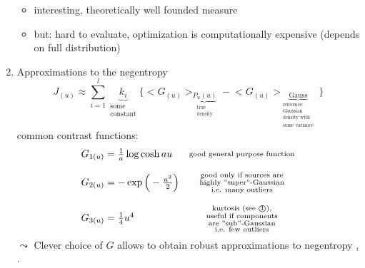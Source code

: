 \begin{enumerate}[(1)]
\begin{itemize}
	\item interesting, theoretically well founded measure
	\item but: hard to evaluate, optimization is computationally expensive (depends on full distribution)
\end{itemize}
\item Approximations to the negentropy
\begin{equation}
	J_{(u)} \approx \sum\limits_{i = 1}^l \underbrace{ k_i }_{
		\substack{	\text{some} \\ \text{constant}} }
		\bigg\{ \Big< G_{(u)} \Big>_{ \underbrace{ P_u (u) }_{
			\substack{ \text{true} \\ \text{density} } } }
		- \Big< G_{(u)} \Big>_{ \underbrace{ \mathrm{Gauss} }_{
			\substack{ 	\text{reference:} \\
					\text{Gaussian} \\
					\text{density with} \\
					\text{some variance}} } } \bigg\}
\end{equation}
common contrast functions:
\[ \begin{array}{lc}
	G_{1(u)} = \frac{1}{a} \log \cosh a u 
	& \substack{ 	\text{good general purpose function} } \\\\
	G_{2(u)} = -\exp \Big( -\frac{u^2}{2} \Big) 
	& \substack{	\text{good only if sources are} \\
			\text{highly ''super''-Gaussian} \\
			\text{i.e. many outliers} } \\\\
	G_{3(u)} = \frac{1}{4} u^4
	& \substack{	\text{kurtosis (see \textcircled{1}),} \\
			\text{useful if components} \\
			\text{are ''sub''-Gaussian} \\
			\text{i.e. few outliers}}
\end{array} \]
$\leadsto$ Clever choice of $G$ allows to obtain robust approximations to negentropy \textcite{Hyvaerinen1997}, \textcite{HyvaerinenOja2000}. 
\end{enumerate}

